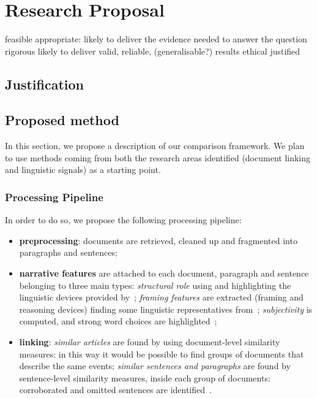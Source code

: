\chapter{Research Proposal}
\label{chap:proposal}

feasible
appropriate:  likely to deliver the evidence needed to answer the question
rigorous
likely to deliver valid, reliable, (generalisable?) results
ethical
justified


\section{Justification}

\section{Proposed method}


In this section, we propose a description of our comparison framework.
We plan to use methods coming from both the research areas identified (document linking and linguistic signals) as a starting point.

\subsection{Processing Pipeline}
In order to do so, we propose the following processing pipeline:
\begin{itemize}
    \item \textbf{preprocessing}: documents are retrieved, cleaned up and fragmented into paragraphs and sentences;
    \item \textbf{narrative features} are attached to each document, paragraph and sentence belonging to three main types:
    \emph{structural role} using and highlighting the linguistic devices provided by~\cite{zahid2019towards};
    \emph{framing features} are extracted (framing and reasoning devices) finding some linguistic representatives from~\cite{gamson1989media,fillmore2006frame};
    \emph{subjectivity} is computed, and strong word choices are highlighted~\cite{liu2010sentiment};
    \item \textbf{linking}: \emph{similar articles} are found by using document-level similarity measures: in this way it would be possible to find groups of documents that describe the same events; \emph{similar sentences and paragraphs} are found by sentence-level similarity measures, inside each group of documents: corroborated and omitted sentences are identified~\cite{bountouridis2018explaining}.
\end{itemize}

